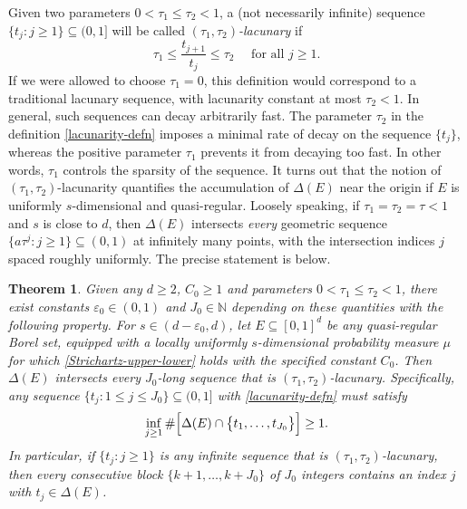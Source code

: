 \documentclass[a4paper,11pt]{amsart}
\newtheorem{thm}{\bf Theorem}[section]
\numberwithin{equation}{section}
\begin{document}
\noindent Given two parameters $0 < \tau_1 \leq \tau_2 < 1$, a (not necessarily infinite) sequence $\{t_j : j \geq 1\} \subseteq (0, 1]$ will be called {\em{$(\tau_1, \tau_2)$-lacunary}} if  
\begin{equation} \label{lacunarity-defn} 
\tau_1 \leq \frac{t_{j+1}}{t_j} \leq \tau_2 \quad \text{ for all $j \geq 1$.}
\end{equation} 
If we were allowed to choose $\tau_1 = 0$, this definition would correspond to a traditional lacunary sequence, with lacunarity constant at most $\tau_2 < 1$. In general, such sequences can decay arbitrarily fast. The parameter $\tau_2$ in the definition \eqref{lacunarity-defn} imposes a minimal rate of decay on the sequence $\{t_j\}$, whereas the positive parameter $\tau_1$ prevents it from decaying too fast. In other words, $\tau_1$ controls the sparsity of the sequence. It turns out that the notion of $(\tau_1, \tau_2)$-lacunarity quantifies the accumulation of $\Delta(E)$ near the origin if $E$ is uniformly $s$-dimensional and quasi-regular. Loosely speaking, if $\tau_1 = \tau_2 = \tau < 1$ and $s$ is close to $d$, then $\Delta(E)$ intersects {\em{every}} geometric sequence $\{a\tau^j: j \geq 1\} \subseteq (0,1)$ at infinitely many points, with the intersection indices $j$ spaced roughly uniformly.  The precise statement is below.   
\begin{thm} \label{quasiregular-distance-thm}
Given any $d \geq 2$, $C_0 \geq 1$ and parameters $0 < \tau_1 \leq \tau_2 < 1$, there exist constants $\varepsilon_0 \in (0, 1)$ and $J_0 \in \mathbb N$  depending on these quantities with the following property. 
\vskip0.1in 
\noindent For $s \in (d - \varepsilon_0, d)$, let $E \subseteq [0,1]^d$ be any quasi-regular Borel set, equipped with a locally uniformly $s$-dimensional probability measure $\mu$  for which \eqref{Strichartz-upper-lower} holds with the specified constant $C_0$. Then $\Delta(E)$ intersects every $J_0$-long sequence that is $(\tau_1, \tau_2)$-lacunary.  Specifically, any sequence $\{t_j : 1 \leq j \leq J_0\} \subseteq (0,1]$ with \eqref{lacunarity-defn} must satisfy 
\begin{equation} \inf_{j \geq 1} \# \Bigl[ \Delta(E) \cap \bigl\{t_{1}, \ldots, t_{J_0}\bigr\} \Bigr] \geq 1. \label{J-consecutive} \end{equation}  
In particular, if $\{t_j : j \geq 1\}$ is any infinite sequence that is $(\tau_1, \tau_2)$-lacunary, then every consecutive block $\{k+1, \ldots, k+J_0\}$ of $J_0$ integers contains an index $j$ with $t_j \in \Delta(E)$.   
\end{thm} 
\end{document}
